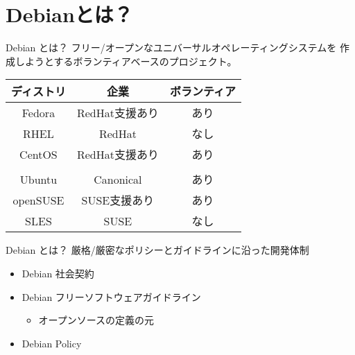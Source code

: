 \documentclass[cjk,c,squeeze,shrink,dvipdfmx,12pt,handout]{beamer}
\begin{document}
\section{Debianとは？}
\begin{frame}[fragile]{Debian とは？}
  \alert{フリー/オープン}な\alert{ユニバーサル}オペレーティングシステムを
  作成しようとするボランティアベースのプロジェクト。
  \vfill
  \centering
  \begin{tabular}{|c|c|c|}
    \hline
    ディストリ          & 企業              & ボランティア      \\
    \hline
    Fedora              & RedHat支援あり    & あり              \\
    \hline
    RHEL                & RedHat            & なし              \\
    \hline
    CentOS              & RedHat支援あり    & あり              \\
    \hline
    \color{red}{Debian} & \color{red}{なし} & \color{red}{あり} \\
    \hline
    Ubuntu              & Canonical         & あり              \\
    \hline
    openSUSE            & SUSE支援あり      & あり              \\
    \hline
    SLES                & SUSE              & なし              \\
    \hline
  \end{tabular}
  \vfill
\end{frame}
\begin{frame}[fragile]{Debian とは？}
  厳格/厳密なポリシーとガイドラインに沿った開発体制
  \begin{itemize}
  \item Debian 社会契約
  \item Debian フリーソフトウェアガイドライン
    \begin{itemize}
    \item オープンソースの定義の元
    \end{itemize}
  \item Debian Policy
  \end{itemize}
\end{frame}
\end{document}
